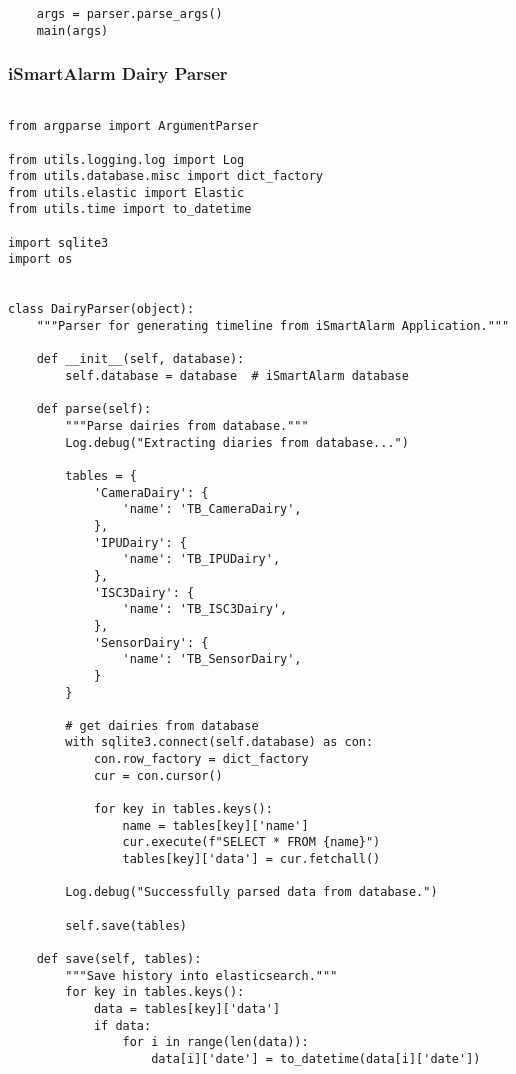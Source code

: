 \documentclass{easychair}
\begin{document}
\begin{enumerate}
\begin{lstlisting}
    args = parser.parse_args()
    main(args)

\end{lstlisting}


    
\subsubsection{iSmartAlarm Dairy Parser}


\lstset{language=Python}
\lstset{frame=lines}
\lstset{basicstyle=\footnotesize}
\begin{lstlisting}

from argparse import ArgumentParser

from utils.logging.log import Log
from utils.database.misc import dict_factory
from utils.elastic import Elastic
from utils.time import to_datetime

import sqlite3
import os


class DairyParser(object):
    """Parser for generating timeline from iSmartAlarm Application."""

    def __init__(self, database):
        self.database = database  # iSmartAlarm database

    def parse(self):
        """Parse dairies from database."""
        Log.debug("Extracting diaries from database...")

        tables = {
            'CameraDairy': {
                'name': 'TB_CameraDairy',
            },
            'IPUDairy': {
                'name': 'TB_IPUDairy',
            },
            'ISC3Dairy': {
                'name': 'TB_ISC3Dairy',
            },
            'SensorDairy': {
                'name': 'TB_SensorDairy',
            }
        }

        # get dairies from database
        with sqlite3.connect(self.database) as con:
            con.row_factory = dict_factory
            cur = con.cursor()

            for key in tables.keys():
                name = tables[key]['name']
                cur.execute(f"SELECT * FROM {name}")
                tables[key]['data'] = cur.fetchall()

        Log.debug("Successfully parsed data from database.")

        self.save(tables)

    def save(self, tables):
        """Save history into elasticsearch."""
        for key in tables.keys():
            data = tables[key]['data']
            if data:
                for i in range(len(data)):
                    data[i]['date'] = to_datetime(data[i]['date'])


\end{lstlisting}
\end{enumerate}
\end{document}

